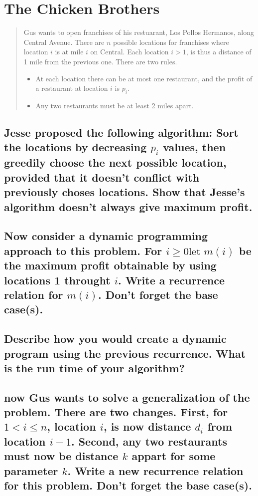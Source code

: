 \documentclass[titlepage]{article}\usepackage[]{graphicx}\usepackage[]{color}
\begin{document}
\section{The Chicken Brothers} 
\begin{quote}
Gus wants to open franchises of his restuarant, Los Pollos Hermanos,
along Central Avenue. There are $n$ possible locations for franchises where
location $i$ is at mile $i$ on Central. Each location $i>1$, is thus a distance
of 1 mile from the previous one. There are two rules.
\begin{itemize}
\item At each location there can be at most one restaurant, and the profit of a
  restaurant at location $i$ is $p_i$. 
  \item Any two restaurants must be at least 2 miles apart.
\end{itemize}
\end{quote}
\subsection{ Jesse proposed the following algorithm: Sort the locations by
  decreasing $p_i$ values, then greedily choose the next possible location,
  provided that it doesn't conflict with previously choses locations. Show that
Jesse's algorithm doesn't always give maximum profit.}



\subsection{Now consider a dynamic programming approach to this problem. For
  $i\geq 0 \text{let } m(i)$ be the maximum profit obtainable by using
  locations 1 throught $i$. Write a recurrence relation for $m(i)$. Don't
forget the base case(s).}


\subsection{Describe how you would create a dynamic program using the previous
recurrence. What is the run time of your algorithm?} 

\subsection{now Gus wants to solve a generalization of the problem. There are
  two changes. First, for $1 < i \leq n$, location $i$, is now distance $d_i$
  from location $i-1$. Second, any two restaurants must now be distance $k$
  appart for some parameter $k$. Write a new recurrence relation for this
problem. Don't forget the base case(s).}
\end{document}
